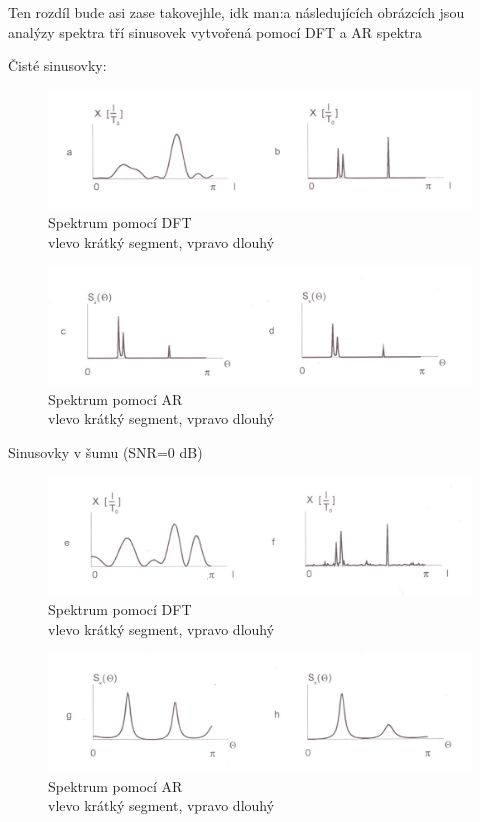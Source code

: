 \documentclass[a4paper,12pt]{article}   %
\begin{document}
Ten rozdíl bude asi zase takovejhle, idk man:a následujících obrázcích jsou analýzy spektra tří sinusovek vytvořená pomocí DFT a AR spektra\\
{Čisté sinusovky:\\
\begin{figure}[!htb]
        \centering
        \includegraphics[width=.6\textwidth]{fig/DFT_clean.png}
        \caption*{Spektrum pomocí DFT\\ vlevo krátký segment, vpravo dlouhý}
\end{figure}
\begin{figure}[!htb]
        \centering
        \includegraphics[width=.6\textwidth]{fig/AR_clean.png}
        \caption*{Spektrum pomocí AR\\ vlevo krátký segment, vpravo dlouhý}
\end{figure}}
\FloatBarrier
\pagebreak
{Sinusovky v šumu (SNR=0 dB)\\
\begin{figure}[h!]
        \centering
        \includegraphics[width=.6\textwidth]{fig/DFT_noise.png}
        \caption*{Spektrum pomocí DFT\\ vlevo krátký segment, vpravo dlouhý}
\end{figure}
\begin{figure}[h!]
        \centering
        \includegraphics[width=.6\textwidth]{fig/AR_noise.png}
        \caption*{Spektrum pomocí AR\\ vlevo krátký segment, vpravo dlouhý}
\end{figure}}
\FloatBarrier
\end{document}
